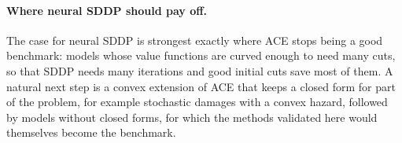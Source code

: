 \paragraph{Where neural SDDP should pay off.} The case for neural SDDP is strongest exactly where ACE stops being a good benchmark: models whose value functions are curved enough to need many cuts, so that SDDP needs many iterations and good initial cuts save most of them. A natural next step is a convex extension of ACE that keeps a closed form for part of the problem, for example stochastic damages with a convex hazard, followed by models without closed forms, for which the methods validated here would themselves become the benchmark.
